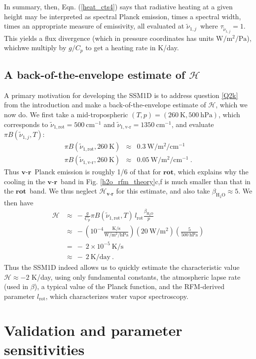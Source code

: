 \documentclass{ametsoc}
\newcommand{\beqn}{\begin{equation}}
\newcommand{\eeqn}{\end{equation}}
\newcommand{\beqa}{\begin{eqnarray}}
\newcommand{\eeqa}{\end{eqnarray}}
\newcommand{\n}{\nonumber}
\newcommand{\eqnref}[1]{(\ref{#1})}
\newcommand{\second}{\ensuremath{\mathrm{s}}}
\newcommand{\Kelvin}{\ensuremath{\mathrm{K}}}
\newcommand{\Wmsq}{\ensuremath{\mathrm{W/m^2}}}
\newcommand{\cminverse}{\ensuremath{\mathrm{cm^{-1}}}}
\newcommand{\Pa}{\ensuremath{\mathrm{Pa}}}
\newcommand{\hPa}{\ensuremath{\mathrm{hPa}}}
\newcommand{\Cp}{\ensuremath{C_p}}
\newcommand{\htwo}{\ensuremath{\mathrm{H_2O}}}
\newcommand{\wv}{\ensuremath{\widetilde{\nu}}}
\newcommand{\ch}{\ensuremath{\mathcal{H}}}
\newcommand{\konerot}{\ensuremath{\wv_{1,\mathrm{rot}}}}
\newcommand{\konevr}{\ensuremath{\wv_{1,\text{v-r}}}}
\newcommand{\konej}{\ensuremath{\wv_{1,j}}}
\newcommand{\lrot}{\ensuremath{l_\mathrm{rot}}}
\newcommand{\vr}{\ensuremath{\textbf{v-r}}}
\newcommand{\rot}{\ensuremath{\textbf{rot}}}
\begin{document}
In summary, then, Eqn.  \eqnref{heat_cts4} says that radiative heating at a given height may be interpreted as spectral Planck emission, times a spectral width,  times an appropriate measure of emissivity,  all evaluated at \konej\ where $\tau_{\konej}=1$. This yields a flux divergence (which in pressure coordinates has units $\Wmsq/\Pa$), whichwe multiply by $g/\Cp$ to get a heating rate in K/day.
 
\subsection{A back-of-the-envelope estimate of \ch} \label{sec_2k}
 A primary motivation for developing the SSM1D is to address question \ref{Q2k} from the introduction and make a back-of-the-envelope estimate of \ch, which we now do.   We first take a mid-tropospheric $(T,p)=(260\ \Kelvin,500\ \hPa)$, which corresponds to $\konerot=500\ \cminverse$ and $\konevr=1350\ \cminverse$, and evaluate $\pi B(\konej,T)$:
\beqa
	 \pi B(\konerot,260\ \Kelvin) & \approx & 0.3 \ \Wmsq/\cminverse \n \\ 
	 \pi B(\konevr,260\ \Kelvin)  & \approx  & 0.05 \ \Wmsq/\cminverse \n \ .
\eeqa 
Thus \vr\ Planck emission is roughly 1/6 of that for \rot, which explains why the cooling in the \vr\ band in Fig. \ref{h2o_rfm_theory}c,f is much smaller than that in the \rot\ band. We thus neglect $\ch_\vr$ for this estimate, and  also take $\beta_\htwo \approx 5$. We then have
\beqn
	\begin{split}
  		\ch & \approx \ - \frac{g}{\Cp}\pi B(\konerot,T)\, \lrot \frac{\beta_{\htwo}}{p} \\
     		  & \approx \ - \left(10^{-4}\frac{\Kelvin/\second}{\Wmsq/\hPa}\right)(20\ \Wmsq)\left(\frac{5}{500\ \hPa}\right)  \\
    			  & = \ -\ 2 \times 10^{-5}\ \Kelvin/\second \\
    		  	  & \approx \ -\ 2\ \text{K/day} \ .
	\end{split}
	 \label{2k_est}
\eeqn
 Thus the SSM1D indeed allows us to quickly estimate the characteristic value  $\ch \approx -2$ K/day, using only fundamental constants, the atmospheric lapse rate (used in $\beta$), a typical value of the Planck function, and the RFM-derived parameter \lrot, which characterizes  water vapor spectroscopy. 

\section{Validation and parameter sensitivities} \label{sec_validation}
 
\end{document}
